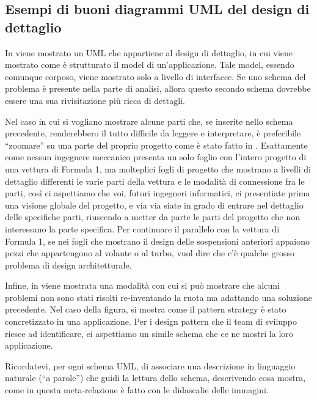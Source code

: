 \documentclass[a4paper,12pt]{report}
\begin{document}
\subsection*{Esempi di buoni diagrammi UML del design di dettaglio}

In  viene mostrato un UML che appartiene al design di dettaglio, in cui viene mostrato come è strutturato il model di un'applicazione.
%
Tale model, essendo comunque corposo, viene mostrato solo a livello di interfacce.
%
Se uno schema del problema è presente nella parte di analisi, allora questo secondo schema dovrebbe essere una sua rivisitazione più ricca di dettagli.

Nel caso in cui si vogliano mostrare alcune parti che, se inserite nello schema precedente, renderebbero il tutto difficile da leggere e interpretare, è preferibile ``zoomare'' su una parte del proprio progetto come è stato fatto in .
%
Esattamente come nessun ingegnere meccanico presenta un solo foglio con l'intero progetto di una vettura di Formula 1, ma molteplici fogli di progetto che mostrano a livelli di dettaglio differenti le varie parti della vettura e le modalità di connessione fra le parti, così ci aspettiamo che voi, futuri ingegneri informatici, ci presentiate prima una visione globale del progetto, e via via siate in grado di entrare nel dettaglio delle specifiche parti, riuscendo a metter da parte le parti del progetto che non interessano la parte specifica.
%
Per continuare il parallelo con la vettura di Formula 1, se nei fogli che mostrano il design delle sospensioni anteriori appaiono pezzi che appartengono al volante o al turbo, vuol dire che c'è qualche grosso problema di design architetturale.

Infine, in  viene mostrata una modalità con cui si può mostrare che alcuni problemi non sono stati risolti re-inventando la ruota ma adattando una soluzione precedente.
%
Nel caso della figura, si mostra come il pattern strategy è stato concretizzato in una applicazione.
%
Per i design pattern che il team di sviluppo riesce ad identificare, ci aspettiamo un simile schema che ce ne mostri la loro applicazione.

Ricordatevi, per ogni schema UML, di associare una descrizione in linguaggio naturale (``a parole'') che guidi la lettura dello schema, descrivendo cosa mostra, come in questa meta-relazione è fatto con le didascalie delle immagini.
\end{document}
